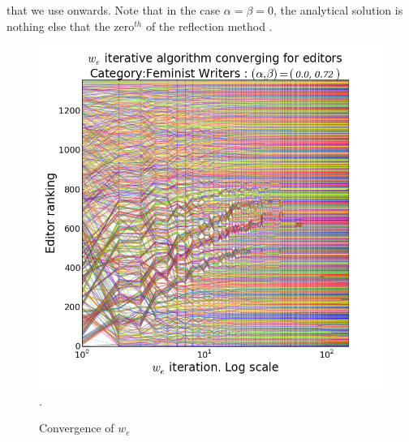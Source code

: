 that we use onwards. Note that in the case $\alpha = \beta = 0$, the analytical solution is nothing else that the zero$^{th}$ of the reflection method \cite{caldarelli2012network}.

\begin{figure}[!t]
\centering
\includegraphics[width=0.9\columnwidth]{Figures/fem_editors_iter_converge.png}.
\caption{Convergence of $w_e$}
\label{fig:convergence}
\end{figure}

